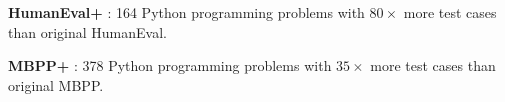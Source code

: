 
\textbf{HumanEval+} \citep{liu2024evalplus}: 164 Python programming problems with $80\times$ more test cases than original HumanEval.

\textbf{MBPP+} \citep{liu2024evalplus}: 378 Python programming problems with $35\times$ more test cases than original MBPP.
